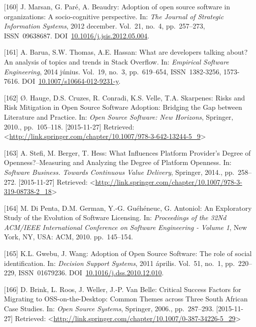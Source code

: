 \documentclass[12pt,magyar,a4paper,oneside]{scrreprt}
\begin{document}
\leavevmode\hypertarget{ref-marsan_adoption_2012}{}%
{[}160{]} J. Marsan, G. Paré, A. Beaudry: Adoption of open source
software in organizations: A socio-cognitive perspective. In: \emph{The
Journal of Strategic Information Systems}, 2012 december. Vol.~21,
no.~4, pp.~257--273, ISSN~09638687.
DOI~\href{https://doi.org/10.1016/j.jsis.2012.05.004}{10.1016/j.jsis.2012.05.004}.

\leavevmode\hypertarget{ref-barua_what_2014}{}%
{[}161{]} A. Barua, S.W. Thomas, A.E. Hassan: What are developers
talking about? An analysis of topics and trends in Stack Overflow. In:
\emph{Empirical Software Engineering}, 2014 június. Vol.~19, no.~3,
pp.~619--654, ISSN~1382-3256, 1573-7616.
DOI~\href{https://doi.org/10.1007/s10664-012-9231-y}{10.1007/s10664-012-9231-y}.

\leavevmode\hypertarget{ref-hauge_risks_2010}{}%
{[}162{]} Ø. Hauge, D.S. Cruzes, R. Conradi, K.S. Velle, T.A. Skarpenes:
Risks and Risk Mitigation in Open Source Software Adoption: Bridging the
Gap between Literature and Practice. In: \emph{Open Source Software: New
Horizons}, Springer, 2010., pp.~105--118. {[}2015-11-27{]} Retrieved:
\textless{}\url{http://link.springer.com/chapter/10.1007/978-3-642-13244-5_9}\textgreater{}

\leavevmode\hypertarget{ref-stefi_what_2014}{}%
{[}163{]} A. Stefi, M. Berger, T. Hess: What Influences Platform
Provider's Degree of Openness?--Measuring and Analyzing the Degree of
Platform Openness. In: \emph{Software Business. Towards Continuous Value
Delivery}, Springer, 2014., pp.~258--272. {[}2015-11-27{]} Retrieved:
\textless{}\url{http://link.springer.com/chapter/10.1007/978-3-319-08738-2_18}\textgreater{}

\leavevmode\hypertarget{ref-di_penta_exploratory_2010}{}%
{[}164{]} M. Di Penta, D.M. German, Y.-G. Guéhéneuc, G. Antoniol: An
Exploratory Study of the Evolution of Software Licensing. In:
\emph{Proceedings of the 32Nd ACM/IEEE International Conference on
Software Engineering - Volume 1}, New York, NY, USA: ACM, 2010.
pp.~145--154.

\leavevmode\hypertarget{ref-gwebu_adoption_2011}{}%
{[}165{]} K.L. Gwebu, J. Wang: Adoption of Open Source Software: The
role of social identification. In: \emph{Decision Support Systems}, 2011
április. Vol.~51, no.~1, pp.~220--229, ISSN~01679236.
DOI~\href{https://doi.org/10.1016/j.dss.2010.12.010}{10.1016/j.dss.2010.12.010}.

\leavevmode\hypertarget{ref-brink_critical_2006}{}%
{[}166{]} D. Brink, L. Roos, J. Weller, J.-P. Van Belle: Critical
Success Factors for Migrating to OSS-on-the-Desktop: Common Themes
across Three South African Case Studies. In: \emph{Open Source Systems},
Springer, 2006., pp.~287--293. {[}2015-11-27{]} Retrieved:
\textless{}\url{http://link.springer.com/chapter/10.1007/0-387-34226-5_29}\textgreater{}
\end{document}
